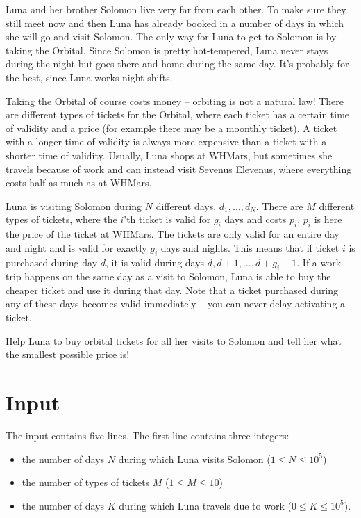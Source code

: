 \def\version{jury-2}
\noindent
Luna and her brother Solomon live very far from each other.
To make sure they still meet now and then Luna has already booked in a number of days in which she will go and visit Solomon.
The only way for Luna to get to Solomon is by taking the Orbital.
Since Solomon is pretty hot-tempered, Luna never stays during the night but goes there and home during the same day.
It's probably for the best, since Luna works night shifts.

Taking the Orbital of course costs money -- orbiting is not a natural law!
There are different types of tickets for the Orbital, where each ticket has a certain time of validity and a price (for example there may be a moonthly ticket).
A ticket with a longer time of validity is always more expensive than a ticket with a shorter time of validity.
Usually, Luna shops at WHMars, but sometimes she travels because of work and can instead visit Sevenus Elevenus, where everything costs half as much as at WHMars.

Luna is visiting Solomon during $N$ different days, $d_1, \dots, d_N$.
There are $M$ different types of tickets, where the $i$'th ticket is valid for $g_i$ days and costs $p_i$.
$p_i$ is here the price of the ticket at WHMars.
The tickets are only valid for an entire day and night and is valid for exactly $g_i$ days and nights.
This means that if ticket $i$ is purchased during day $d$, it is valid during days $d, d+1, \dots, d+g_i-1$.
If a work trip happens on the same day as a visit to Solomon, Luna is able to buy the cheaper ticket and use it during that day.
Note that a ticket purchased during any of these days becomes valid immediately -- you can never delay activating a ticket.

Help Luna to buy orbital tickets for all her visits to Solomon and tell her what the smallest possible price is!

\section*{Input}
The input contains five lines.
The first line contains three integers:
\begin{itemize}
        \item the number of days $N$ during which Luna visits Solomon ($1\leq N\leq 10^5$)
        \item the number of types of tickets $M$ ($1\leq M\leq 10$)
        \item the number of days $K$ during which Luna travels due to work ($0\leq K\leq 10^5$).
\end{itemize}

